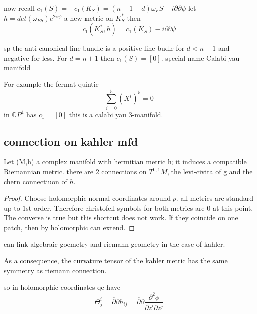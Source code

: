 now recall $c_1(S) = -c_1(K_S) = (n+1-d)\omega_FS - i \partial \overline{\partial} \psi$
let $h = det(\omega_{FS})e^{2 \pi \psi}$ a new metric on $K_S^*$ then
\begin{equation}
    c_1(K_S^*,h) = c_1(K_S) - i \partial \overline{\partial} \psi
\end{equation}

sp the anti canonical line bundle is a positive line budle for $d < n+1$ and negative for less. For $d = n+1$ then $c_1(S) = [0]$. special name Calabi yau manifold

For example the fermat quintic
\begin{equation}
    \sum_{i=0}^5 (X^i)^5 = 0
\end{equation}
in $\mathbb{C}P^4$ has $c_1 = [0]$ this is a calabi yau $3$-manifold.
\subsection{connection on kahler mfd} %
\label{sub:connection_on_kahler_mfd}
Let (M,h) a complex manifold with hermitian metric h; it induces a compatible Riemannian metric.
there are 2 connections on $T^{0,1}M$, the levi-civita of g and the chern connectiuon of $h$.
\begin{proof}
    Choose holomorphic normal coordinates around $p$. all metrics are standard up to $1$st order.
    Therefore christofell symbols for both metrics are 0 at this point.
    The converse is true but this shortcut does not work.
    If they coincide on one patch, then by holomorphic can extend.
\end{proof}
can link algebraic goemetry and riemann geometry in the case of kahler.

As a consequence, the curvature tensor of the kahler metric has the same symmetry as riemann connection.

so in holomorphic coordinates
qe have
\begin{equation}
    \Theta^i_j = \overline{\partial} \partial \overline{h}_{ij} = \overline{\partial}\partial 
    \frac{\partial^2 \phi}{\partial \overline{z}^i \partial z^j}
\end{equation}

